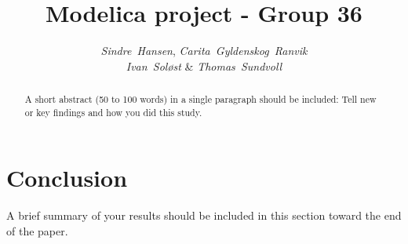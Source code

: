 \documentclass[journal]{IEEEtran}
\title{\Large \bf Modelica project - Group 36}
\date{}
\author{
\textit{Sindre~Hansen}, \textit{Carita~Gyldenskog~Ranvik}  \\ 
\textit{Ivan~Soløst} \& \textit{Thomas~Sundvoll}}
\begin{document}
\renewcommand\figurename{Fig.}

\maketitle
\thispagestyle{empty}
\pagestyle{empty}



\begin{abstract} 
A short abstract (50 to 100 words) in a single paragraph should be included: Tell new or key findings and how you did this study.
\end{abstract}



%

%

%

%

%

%
%
%
\section*{Conclusion}
A brief summary of your results should be included in this section toward the end of the paper.
\newpage


\printbibliography
\end{document}
